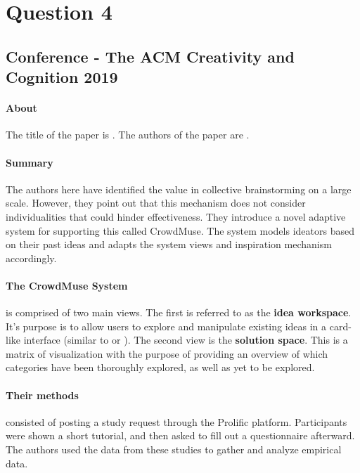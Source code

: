 \section{Question 4}

\subsection{Conference - The ACM Creativity and Cognition 2019}

\paragraph{About}
The title of the paper is . The authors of the paper are .

\paragraph{Summary}
The authors here have identified the value in collective brainstorming on a large scale. However, they point out that this mechanism does not consider individualities that could hinder effectiveness. They introduce a novel adaptive system for supporting this called CrowdMuse. The system models ideators based on their past ideas and adapts the system views and inspiration mechanism accordingly.

\paragraph{The CrowdMuse System} is comprised of two main views. The first is referred to as the \textbf{idea workspace}. It's purpose is to allow users to explore and manipulate existing ideas in a card-like interface (similar to  or ). The second view is the \textbf{solution space}. This is a matrix of visualization with the purpose of providing an overview of which categories have been thoroughly explored, as well as yet to be explored.

\paragraph{Their methods} consisted of posting a study request through the Prolific platform. Participants were shown a short tutorial, and then asked to fill out a questionnaire afterward. The authors used the data from these studies to gather and analyze empirical data.

